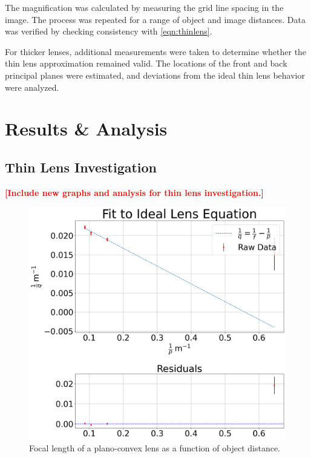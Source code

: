 \documentclass[aip, cp, amsmath, amssymb, reprint, nofootinbib]{revtex4-2}
\begin{document}
        The magnification was calculated by measuring the grid line spacing in the image. The process was repeated for a range of object and image distances. Data was verified by checking consistency with \eqref{eqn:thinlens}.

        For thicker lenses, additional measurements were taken to determine whether the thin lens approximation remained valid. The locations of the front and back principal planes were estimated, and deviations from the ideal thin lens behavior were analyzed.



    \section{Results \& Analysis}
        \subsection{Thin Lens Investigation}
            \textcolor{red}{\textbf{[Include new graphs and analysis for thin lens investigation.]}}

            \begin{figure}[H]
                \centering
                \includegraphics[width=0.9\linewidth]{figures/ideallens.png}
                \caption{Focal length of a plano-convex lens as a function of object distance.}
                \label{fig:thin-lens}
            \end{figure}
\end{document}
